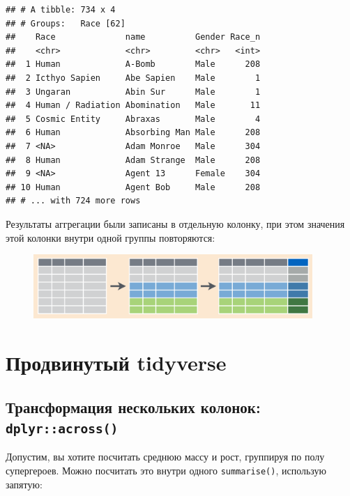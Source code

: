 \documentclass[]{book}
\newenvironment{Shaded}{\begin{snugshade}}{\end{snugshade}}
\newcommand{\KeywordTok}[1]{\textcolor[rgb]{0.13,0.29,0.53}{\textbf{#1}}}
\newcommand{\DataTypeTok}[1]{\textcolor[rgb]{0.13,0.29,0.53}{#1}}
\newcommand{\StringTok}[1]{\textcolor[rgb]{0.31,0.60,0.02}{#1}}
\newcommand{\OtherTok}[1]{\textcolor[rgb]{0.56,0.35,0.01}{#1}}
\newcommand{\OperatorTok}[1]{\textcolor[rgb]{0.81,0.36,0.00}{\textbf{#1}}}
\newcommand{\NormalTok}[1]{#1}
\begin{document}
\begin{verbatim}
## # A tibble: 734 x 4
## # Groups:   Race [62]
##    Race              name          Gender Race_n
##    <chr>             <chr>         <chr>   <int>
##  1 Human             A-Bomb        Male      208
##  2 Icthyo Sapien     Abe Sapien    Male        1
##  3 Ungaran           Abin Sur      Male        1
##  4 Human / Radiation Abomination   Male       11
##  5 Cosmic Entity     Abraxas       Male        4
##  6 Human             Absorbing Man Male      208
##  7 <NA>              Adam Monroe   Male      304
##  8 Human             Adam Strange  Male      208
##  9 <NA>              Agent 13      Female    304
## 10 Human             Agent Bob     Male      208
## # ... with 724 more rows
\end{verbatim}

Результаты аггрегации были записаны в отдельную колонку, при этом
значения этой колонки внутри одной группы повторяются:

\begin{figure}
\centering
\includegraphics[width=4.16667in]{images/group_by_m.png}
\caption{}
\end{figure}

\chapter{Продвинутый tidyverse}\label{tidyverse_advanced}

\section{\texorpdfstring{Трансформация нескольких колонок:
\texttt{dplyr::across()}}{Трансформация нескольких колонок: dplyr::across()}}\label{ux442ux440ux430ux43dux441ux444ux43eux440ux43cux430ux446ux438ux44f-ux43dux435ux441ux43aux43eux43bux44cux43aux438ux445-ux43aux43eux43bux43eux43dux43eux43a-dplyracross}

Допустим, вы хотите посчитать среднюю массу и рост, группируя по полу
супергероев. Можно посчитать это внутри одного \texttt{summarise()},
использую запятую:

\begin{Shaded}
\end{Shaded}
\end{document}
